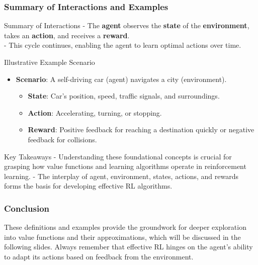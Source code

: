 \documentclass[aspectratio=169]{beamer}
\begin{document}
\begin{frame}[fragile]
    \frametitle{Summary of Interactions and Examples}
    \begin{block}{Summary of Interactions}
        - The \textbf{agent} observes the \textbf{state} of the \textbf{environment}, takes an \textbf{action}, and receives a \textbf{reward}.\\
        - This cycle continues, enabling the agent to learn optimal actions over time.
    \end{block}

    \begin{block}{Illustrative Example Scenario}
        \begin{itemize}
            \item \textbf{Scenario}: A self-driving car (agent) navigates a city (environment).
            \begin{itemize}
                \item \textbf{State}: Car's position, speed, traffic signals, and surroundings.
                \item \textbf{Action}: Accelerating, turning, or stopping.
                \item \textbf{Reward}: Positive feedback for reaching a destination quickly or negative feedback for collisions.
            \end{itemize}
        \end{itemize}
    \end{block}
    
    \begin{block}{Key Takeaways}
        - Understanding these foundational concepts is crucial for grasping how value functions and learning algorithms operate in reinforcement learning.
        - The interplay of agent, environment, states, actions, and rewards forms the basis for developing effective RL algorithms.
    \end{block}
\end{frame}

\begin{frame}[fragile]
    \frametitle{Conclusion}
    These definitions and examples provide the groundwork for deeper exploration into value functions and their approximations, which will be discussed in the following slides. Always remember that effective RL hinges on the agent’s ability to adapt its actions based on feedback from the environment.
\end{frame}
\end{document}
